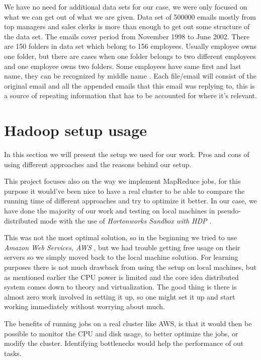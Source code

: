\documentclass{llncs}
\begin{document}
We have no need for additional data sets for our case, we were only focused on what we can get out of what we are given. Data set of 500000 emails mostly from top managers and sales clerks is more than enough to get out some structure of the data set. The emails cover period from November 1998 to June 2002. There are 150 folders in data set which belong to 156 employees. Usually employee owns one folder, but there are cases when one folder belongs to two different employees and one employee owns two folders. Some employees
have same first and last name, they can be recognized by middle name \cite{Enron mining}. Each file/email will consist of the original email and all the appended emails that this email was replying to, this is a source of repeating information that has to be accounted for where it's relevant.

\section{Hadoop setup usage}
In this section we will present the setup we used for our work. Pros and cons of using different approaches and the reasons behind our setup.

This project focuses also on the way we implement MapReduce jobs, for this purpose it would've been nice to have a real cluster to be able to compare the running time of different approaches and try to optimize it better. In our case, we have done the majority of our work and testing on local machines in pseudo-distributed mode with the use of \emph{Hortonworks Sandbox with HDP} \cite{hortonworks}.

This was not the most optimal solution, so in the beginning we tried to use \emph{Amazon Web Services, AWS} \cite{aws}, but we had trouble getting free usage on their servers so we simply moved back to the local machine solution. For learning purposes there is not much drawback from using the setup on local machines, but as mentioned earlier the CPU power is limited and the core idea distributed system comes down to theory and virtualization. The good thing is there is almost zero work involved in setting it up, so one might set it up and start working immediately without worrying about much.

The benefits of running jobs on a real cluster like AWS, is that it would then be possible to monitor the CPU and disk usage, to better optimize the jobs, or modify the cluster. Identifying bottlenecks would help the performance of out tasks.
\end{document}
